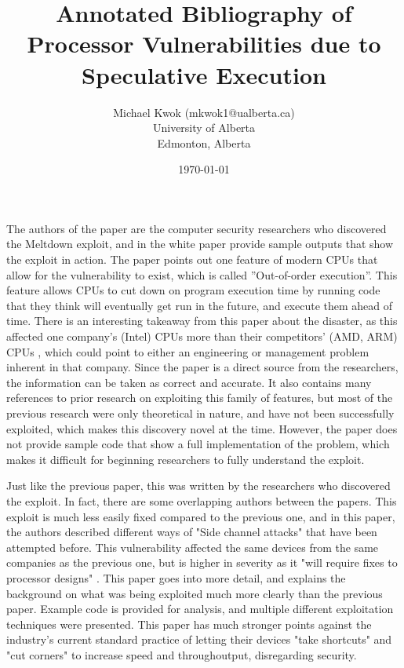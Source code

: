 \documentclass[11pt]{article}
\title{Annotated Bibliography of \\ Processor Vulnerabilities due to \\
Speculative Execution}
\author{Michael Kwok (mkwok1@ualberta.ca) \\ University of Alberta \\ Edmonton,
Alberta}
\date{\today}
\begin{document}
\pagestyle{headings}
\maketitle

\cite{Meltdown} 

The authors of the paper are the computer security researchers who discovered
the Meltdown exploit, and in the white paper provide sample outputs that show
the exploit in action. The paper points out one feature of modern CPUs that
allow for the vulnerability to exist, which is called ”Out-of-order execution”.
This feature allows CPUs to cut down on program execution time by running code
that they think will eventually get run in the future, and execute them ahead of
time. There is an interesting takeaway from this paper about the disaster, as
this affected one company’s (Intel) CPUs more than their competitors’ (AMD, ARM)
CPUs \cite[13]{Meltdown}, which could point to either an engineering or
management problem inherent in that company. Since the paper is a direct source
from the researchers, the information can be taken as correct and accurate. It
also contains many references to prior research on exploiting this family of
features, but most of the previous research were only theoretical in nature,
and have not been successfully exploited, which makes this discovery novel at
the time. However, the paper does not provide sample code that show a full
implementation of the problem, which makes it difficult for beginning
researchers to fully understand the exploit.

\hfill

\cite{Spectre} 

Just like the previous paper, this was written by the researchers who
discovered the exploit. In fact, there are some overlapping authors between the
papers. This exploit is much less easily fixed compared to the previous one, and
in this paper, the authors described different ways of "Side channel attacks"
that have been attempted before. This vulnerability affected the same devices from
the same companies as the previous one, but is higher in severity as it "will
require fixes to processor designs" \cite[1]{Spectre}. This paper goes into more
detail, and explains the background on what was being exploited much more
clearly than the previous paper. Example code is provided for analysis, and
multiple different exploitation techniques were presented. This paper has much
stronger points against the industry's current standard practice of letting their
devices "take shortcuts" and "cut corners" to increase speed and throughoutput,
disregarding security.
\end{document}
